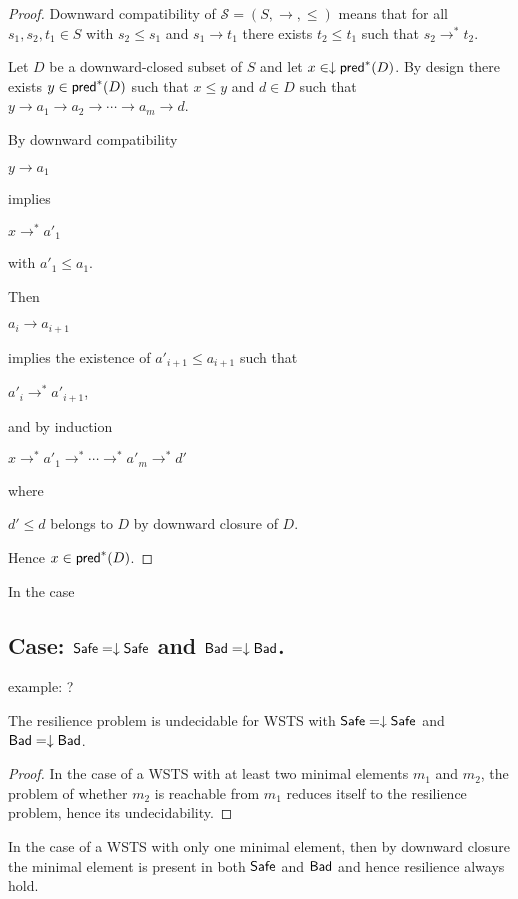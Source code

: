 \begin{proof}
Downward compatibility of $\mathscr{S}=(S,\rightarrow, \leq)$ 
means that
for all $s_1, s_2, t_1 \in S$ with
$s_2 \leq s_1$ and $s_1 \to t_1$
there
exists
$t_2 \leq t_1$ such that $s_2 \to^* t_2$.

Let $D$ be a downward-closed subset of $S$
and let $x \in \downarrow \textsf{pred}^*(D)$.
By design there exists
$y \in \textsf{pred}^*(D)$ 
such that $x \leq y$
and $d \in D$ such that
$y \to a_1 \to a_2 \to \cdots \to a_m \to d$.

By downward compatibility

$y \to a_1$

implies

$x \to^* a'_1$

with 
$a'_1 \leq a_1$.

Then

$a_i \to a_{i+1}$

implies the existence of $a'_{i+1} \leq a_{i+1}$ such that

$a'_i \to^* a'_{i+1}$,

and by induction

 $x \to^* a'_1 \to^* \cdots \to^* a'_{m} \to^* d'$

where

$d' \leq d$ belongs to $D$ by downward closure of $D$.

Hence $x \in \textsf{pred}^*(D)$.
\end{proof}

In the case









\subsection{Case: $\textsf{Safe}=\downarrow \textsf{Safe}$ and $\textsf{Bad}=\downarrow \textsf{Bad}$.}

example: ?


\begin{theorem}\label{down-down}
The resilience problem is undecidable for WSTS with
$\textsf{Safe}=\downarrow \textsf{Safe}$
and $\textsf{Bad}=\downarrow \textsf{Bad}$.
\end{theorem}

\begin{proof}
In the case of a WSTS with at least two minimal elements $m_1$ and $m_2$, the problem of whether $m_2$ is reachable from $m_1$ reduces itself to the resilience problem, hence its undecidability.  
\end{proof}

In the case of a WSTS with only one minimal element,  
then by downward closure the minimal element is present in both $\textsf{Safe}$ and $\textsf{Bad}$ and hence resilience always hold.



